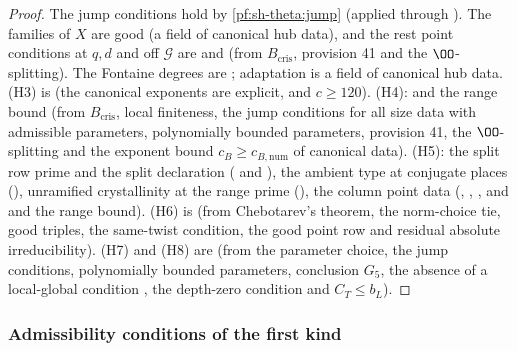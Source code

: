 \begin{proof}
The jump conditions hold by \cref{pf:sh-theta:jump} (applied through ).
The families of $X$ are good (a field of canonical hub data), and the rest point conditions at $q,d$ and off $\mathcal G$ are
 and  (from $B_{\mathrm{cris}}$, provision
41 and the $\OO$-splitting). The Fontaine degrees are ; adaptation is a
field of canonical hub data. (H3) is  (the canonical
exponents are explicit, and $c\ge120$). (H4):  and the range bound
 (from $B_{\mathrm{cris}}$, local finiteness, the jump conditions for all
size data with admissible parameters, polynomially bounded parameters, provision 41, the $\OO$-splitting and the exponent bound
$c_B\ge c_{B,\mathrm{num}}$ of canonical data). (H5): the split row prime and the split declaration
( and ), the ambient type at conjugate places
(), unramified crystallinity at the range prime
(), the column point data
(, , , and 
and the range bound). (H6) is  (from Chebotarev's theorem, the norm-choice tie, good triples,
the same-twist condition, the good point row  and residual absolute
irreducibility). (H7) and (H8) are  (from the parameter choice, the jump
conditions, polynomially bounded parameters, conclusion $G_5$, the absence of a local-global condition
, the depth-zero condition and $C_T\le b_L$).
\end{proof}

\subsubsection{Admissibility conditions of the first kind}

